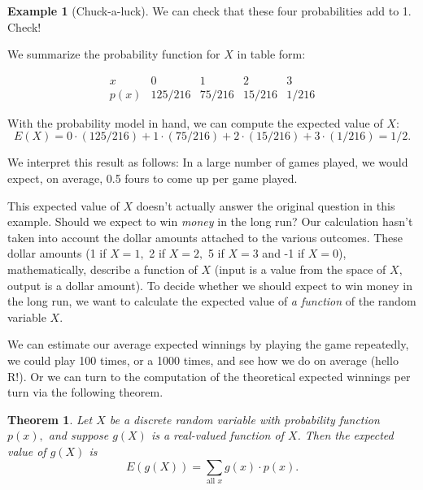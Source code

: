 \documentclass[
]{book}
\newtheorem{theorem}{Theorem}[chapter]
\theoremstyle{definition}
\theoremstyle{definition}
\newtheorem{example}{Example}[chapter]
\theoremstyle{definition}
\theoremstyle{definition}
\theoremstyle{remark}
\begin{document}
\begin{example}[Chuck-a-luck]
We can check that these four probabilities add to 1. Check!

We summarize the probability function for \(X\) in table form:

\[
\begin{array}{c|c|c|c|c}
x & 0 & 1 & 2 & 3 \\ \hline
p(x) & 125/216 & 75/216 & 15/216 & 1/216 
\end{array}
\]

With the probability model in hand, we can compute the expected value of \(X\): \[E(X) = 0 \cdot (125/216) + 1 \cdot (75/216) + 2 \cdot (15/216) + 3 \cdot (1/216) = 1/2.\]

We interpret this result as follows: In a large number of games played, we would expect, on average, 0.5 fours to come up per game played.

This expected value of \(X\) doesn't actually answer the original question in this example. Should we expect to win \emph{money} in the long run? Our calculation hasn't taken into account the dollar amounts attached to the various outcomes. These dollar amounts (1 if \(X = 1,\) 2 if \(X = 2,\) 5 if \(X = 3\) and -1 if \(X = 0\)), mathematically, describe a function of \(X\) (input is a value from the space of \(X,\) output is a dollar amount). To decide whether we should expect to win money in the long run, we want to calculate the expected value of \emph{a function} of the random variable \(X\).

We can estimate our average expected winnings by playing the game repeatedly, we could play 100 times, or a 1000 times, and see how we do on average (hello R!). Or we can turn to the computation of the theoretical expected winnings per turn via the following theorem.
\end{example}

\begin{theorem}
\protect\hypertarget{thm:EV-discrete-fcnRV}{}\label{thm:EV-discrete-fcnRV}Let \(X\) be a discrete random variable with probability function \(p(x),\) and suppose \(g(X)\) is a real-valued function of \(X\). Then the expected value of \(g(X)\) is \[E(g(X)) = \sum_{\text{all }x} g(x) \cdot p(x).\]
\end{theorem}
\end{document}
